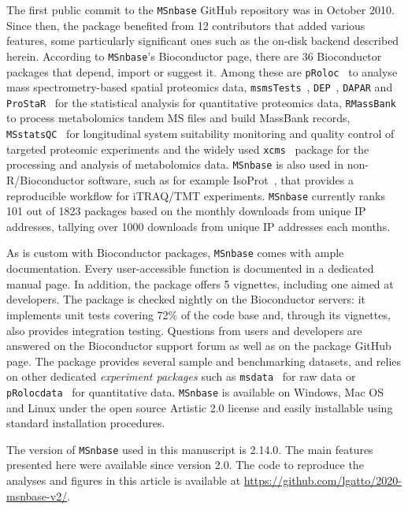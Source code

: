 \documentclass[journal=jacsat,manuscript=article]{achemso}\usepackage[]{graphicx}\usepackage[]{color}
\begin{document}
The first public commit to the \texttt{MSnbase} GitHub repository was
in October 2010. Since then, the package benefited from 12
contributors\cite{contribs} that added various features, some
particularly significant ones such as the on-disk backend described
herein. According to \texttt{MSnbase}'s Bioconductor page, there are
36 Bioconductor packages that depend, import or suggest it. Among
these are \texttt{pRoloc}~\cite{Gatto:2014a} to analyse mass
spectrometry-based spatial proteomics data,
\texttt{msmsTests}~\cite{msmsTests}, \texttt{DEP}~\cite{Zhang:2018},
\texttt{DAPAR} and \texttt{ProStaR}~\cite{Wieczorek:2017} for the
statistical analysis for quantitative proteomics data,
\texttt{RMassBank}~\cite{Stravs:2013} to process metabolomics tandem
MS files and build MassBank records,
\texttt{MSstatsQC}~\cite{Dogu:2017} for longitudinal system
suitability monitoring and quality control of targeted proteomic
experiments and the widely used \texttt{xcms}~\cite{Smith:2006} package
for the processing and analysis of metabolomics data. \texttt{MSnbase}
is also used in non-R/Bioconductor software, such as for example
IsoProt~\cite{Griss:2019}, that provides a reproducible workflow for
iTRAQ/TMT experiments. \texttt{MSnbase} currently ranks 101 out of
1823 packages based on the monthly downloads from unique IP addresses,
tallying over 1000 downloads from unique IP addresses each months.

As is custom with Bioconductor packages, \texttt{MSnbase} comes with
ample documentation. Every user-accessible function is documented in a
dedicated manual page. In addition, the package offers 5 vignettes,
including one aimed at developers. The package is checked nightly on
the Bioconductor servers: it implements unit tests covering 72\% of
the code base and, through its vignettes, also provides integration
testing. Questions from users and developers are answered on the
Bioconductor support forum as well as on the package GitHub page. The
package provides several sample and benchmarking datasets, and relies
on other dedicated \textit{experiment packages} such as
\texttt{msdata}~\cite{msdata} for raw data or
\texttt{pRolocdata}~\cite{Gatto:2014a} for quantitative
data. \texttt{MSnbase} is available on Windows, Mac OS and Linux under
the open source Artistic 2.0 license and easily installable using
standard installation procedures.




The version of \texttt{MSnbase} used in this manuscript is
2.14.0. The main features presented here were available since
version 2.0. The code to reproduce the analyses and figures in this
article is available at
\url{https://github.com/lgatto/2020-msnbase-v2/}.
\end{document}
